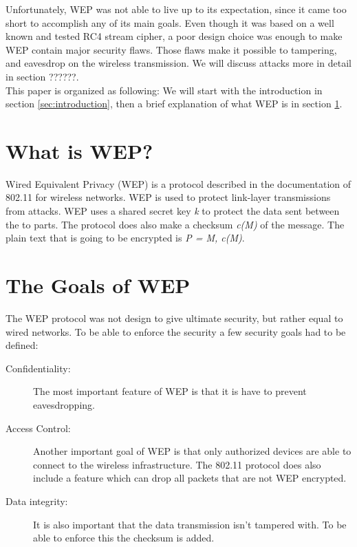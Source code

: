 \documentclass[twocolumn,11pt]{IEEEtran}
\begin{document}
Unfortunately, WEP was not able to live up to its expectation, since it came too short to accomplish any of its main goals. Even though it was based on a well known and tested RC4 stream cipher, a poor design choice was enough to make WEP contain major security flaws. Those flaws make it possible to tampering, and eavesdrop on the wireless transmission. We will discuss attacks more in detail in section ??????. \\



This paper is organized as following: We will start with the introduction in 
section \ref{sec:introduction}, then a brief explanation of what WEP is in 
section \ref{sec:whatiswep}. 


\section {What is WEP?}
\label{sec:whatiswep}

Wired Equivalent Privacy (WEP) is a protocol described in the documentation of 802.11 for wireless networks. WEP is used to protect link-layer transmissions from attacks. WEP uses a shared secret key \emph{k} to protect the data sent between the to parts. The protocol does also make a checksum \emph{c(M)} of the message. The plain text that is going to be encrypted is \emph{P = M, c(M)}. 



\section {The Goals of WEP}
\label{sec:goals}

The WEP protocol was not design to give ultimate security, but rather equal to wired networks. To be able to enforce the security a few security goals had to be defined\cite{IEEE:Fast}:\\

\begin{description}
\item[Confidentiality:] The most important feature of WEP is that it is have to prevent eavesdropping.
\item[Access Control:] Another important goal of WEP is that only authorized devices are able to connect to the wireless infrastructure. The 802.11 protocol does also include a feature which can drop all packets that are not WEP encrypted.
\item[Data integrity:] It is also important that the data transmission isn't tampered with. To be able to enforce this the checksum is added.\\
\end{description}
\end{document}
